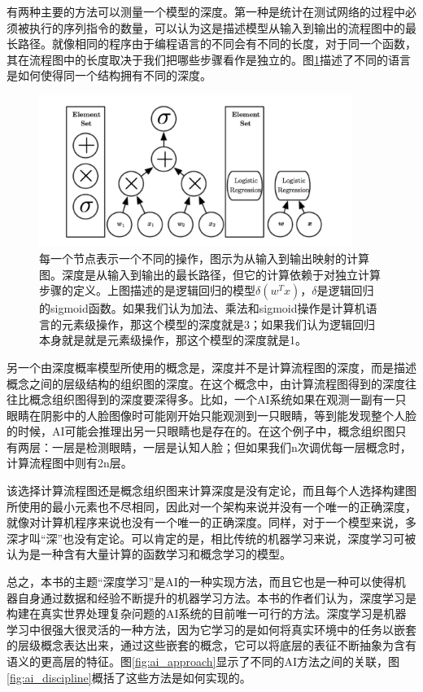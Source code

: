 \documentclass[a4paper,11pt]{book}
\begin{document}
有两种主要的方法可以测量一个模型的深度。第一种是统计在测试网络的过程中必须被执行的序列指令的数量，可以认为这是描述模型从输入到输出的流程图中的最长路径。就像相同的程序由于编程语言的不同会有不同的长度，对于同一个函数，其在流程图中的长度取决于我们把哪些步骤看作是独立的。图\ref{fig:flow_chart}描述了不同的语言是如何使得同一个结构拥有不同的深度。

\begin{figure}[htbp] %
   \centering
   \includegraphics[width=4in]{fig/chap1/flow_chart.png} 
   \caption{每一个节点表示一个不同的操作，图示为从输入到输出映射的计算图。深度是从输入到输出的最长路径，但它的计算依赖于对独立计算步骤的定义。上图描述的是逻辑回归的模型$\delta(w^Tx)$，$\delta$是逻辑回归的sigmoid函数。如果我们认为加法、乘法和sigmoid操作是计算机语言的元素级操作，那这个模型的深度就是3；如果我们认为逻辑回归本身就是就是元素级操作，那这个模型的深度就是1。}
   \label{fig:flow_chart}
\end{figure}


另一个由深度概率模型所使用的概念是，深度并不是计算流程图的深度，而是描述概念之间的层级结构的组织图的深度。在这个概念中，由计算流程图得到的深度往往比概念组织图得到的深度要深得多。比如，一个AI系统如果在观测一副有一只眼睛在阴影中的人脸图像时可能刚开始只能观测到一只眼睛，等到能发现整个人脸的时候，AI可能会推理出另一只眼睛也是存在的。在这个例子中，概念组织图只有两层：一层是检测眼睛，一层是认知人脸；但如果我们n次调优每一层概念时，计算流程图中则有2n层。


该选择计算流程图还是概念组织图来计算深度是没有定论，而且每个人选择构建图所使用的最小元素也不尽相同，因此对一个架构来说并没有一个唯一的正确深度，就像对计算机程序来说也没有一个唯一的正确深度。同样，对于一个模型来说，多深才叫“深”也没有定论。可以肯定的是，相比传统的机器学习来说，深度学习可被认为是一种含有大量计算的函数学习和概念学习的模型。

总之，本书的主题“深度学习”是AI的一种实现方法，而且它也是一种可以使得机器自身通过数据和经验不断提升的机器学习方法。本书的作者们认为，深度学习是构建在真实世界处理复杂问题的AI系统的目前唯一可行的方法。深度学习是机器学习中很强大很灵活的一种方法，因为它学习的是如何将真实环境中的任务以嵌套的层级概念表达出来，通过这些嵌套的概念，它可以将底层的表征不断抽象为含有语义的更高层的特征。图\ref{fig:ai_approach}显示了不同的AI方法之间的关联，图\ref{fig:ai_discipline}概括了这些方法是如何实现的。
\end{document}
